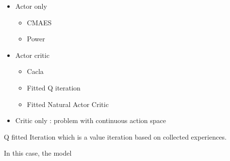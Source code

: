 \begin{itemize}
 \item Actor only
 \begin{itemize}
  \item CMAES
  \item Power
 \end{itemize}
 \item Actor critic
 \begin{itemize}
  \item Cacla
  \item Fitted Q iteration
  \item Fitted Natural Actor Critic 
 \end{itemize}
 \item Critic only : problem with continuous action space
\end{itemize}

Q fitted Iteration which is a value iteration based on collected experiences.

In this case, the model